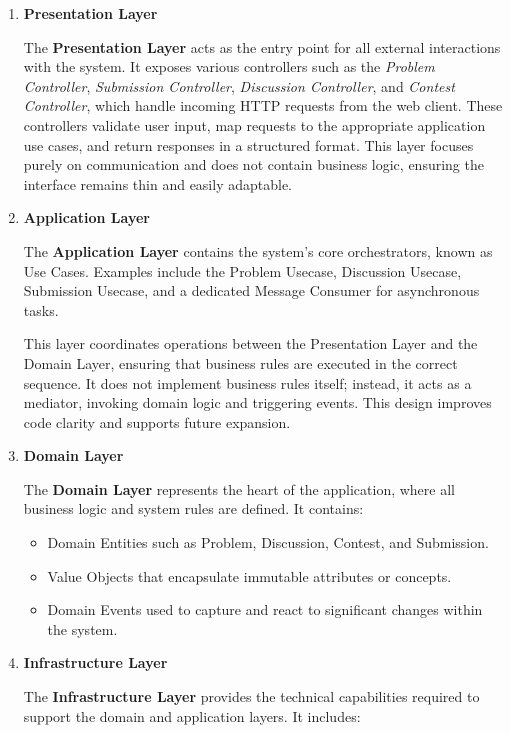 \begin{enumerate}
  \item \textbf{Presentation Layer}
  
The \textbf{Presentation Layer} acts as the entry point for all external interactions with the system. It exposes various controllers such as the \textit{Problem Controller}, \textit{Submission Controller}, \textit{Discussion Controller}, and \textit{Contest Controller}, which handle incoming HTTP requests from the web client. These controllers validate user input, map requests to the appropriate application use cases, and return responses in a structured format. This layer focuses purely on communication and does not contain business logic, ensuring the interface remains thin and easily adaptable.
    \item  \textbf{Application Layer}
    
The \textbf{Application Layer} contains the system’s core orchestrators, known as Use Cases. Examples include the Problem Usecase, Discussion Usecase, Submission Usecase, and a dedicated Message Consumer for asynchronous tasks.

This layer coordinates operations between the Presentation Layer and the Domain Layer, ensuring that business rules are executed in the correct sequence. It does not implement business rules itself; instead, it acts as a mediator, invoking domain logic and triggering events. This design improves code clarity and supports future expansion.

    \item  \textbf{Domain Layer}
    
The \textbf{Domain Layer} represents the heart of the application, where all business logic and system rules are defined. It contains: 

\begin{itemize}
    \item Domain Entities such as Problem, Discussion, Contest, and Submission.
    \item Value Objects that encapsulate immutable attributes or concepts.
    \item Domain Events used to capture and react to significant changes within the system.
\end{itemize}

    \item  \textbf{Infrastructure Layer}
    
The \textbf{Infrastructure Layer} provides the technical capabilities required to support the domain and application layers. It includes: 


\end{enumerate}
